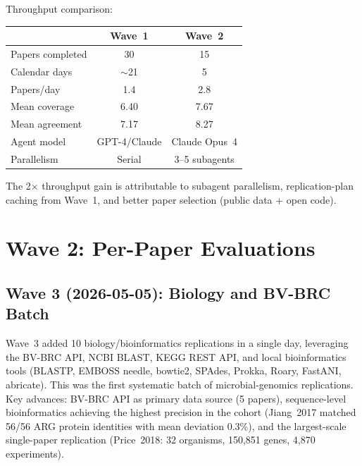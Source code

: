 \noindent Throughput comparison:
\begin{center}
\begin{tabular}{lcc}\toprule
 & Wave~1 & Wave~2 \\\midrule
Papers completed & 30 & 15 \\
Calendar days & $\sim$21 & 5 \\
Papers/day & 1.4 & 2.8 \\
Mean coverage & 6.40 & 7.67 \\
Mean agreement & 7.17 & 8.27 \\
Agent model & GPT-4/Claude & Claude Opus~4 \\
Parallelism & Serial & 3--5 subagents \\\bottomrule
\end{tabular}
\end{center}

The 2$\times$ throughput gain is attributable to subagent parallelism,
replication-plan caching from Wave~1, and better paper selection (public
data + open code).

\iffull
\clearpage
\section*{Wave 2: Per-Paper Evaluations}















\fi

\subsection{Wave 3 (2026-05-05): Biology and BV-BRC Batch}
Wave~3 added 10 biology/bioinformatics replications in a single day,
leveraging the BV-BRC API, NCBI BLAST, KEGG REST API, and local
bioinformatics tools (BLASTP, EMBOSS needle, bowtie2, SPAdes, Prokka,
Roary, FastANI, abricate). This was the first systematic batch of
microbial-genomics replications. Key advances: BV-BRC API as primary
data source (5 papers), sequence-level bioinformatics achieving the
highest precision in the cohort (Jiang~2017 matched 56/56 ARG protein
identities with mean deviation 0.3\%), and the largest-scale single-paper
replication (Price~2018: 32 organisms, 150,851 genes, 4,870 experiments).

